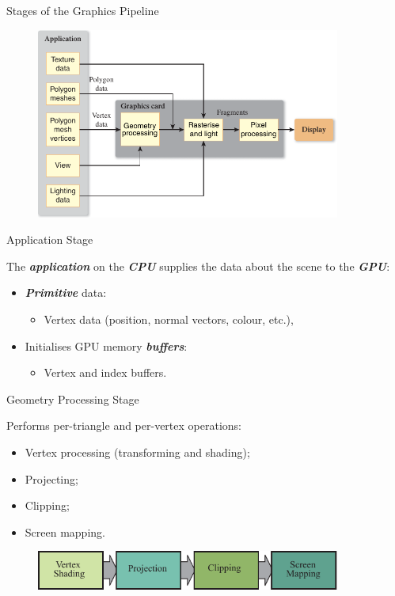 \documentclass{beamer}
\newcommand{\emphbf}[1]{\textbf{\emph{#1}}}
\begin{document}
\begin{frame}{Stages of the Graphics Pipeline}

	\begin{figure}[t]
		\includegraphics[width=10cm]{pipeline-2}
		\centering
	\end{figure}

\end{frame}

\begin{frame}{Application Stage}

	The \emphbf{application} on the \emphbf{CPU} supplies the data about the scene to the \emphbf{GPU}:

	\vskip 1cm

	\begin{itemize}
		\item \emphbf{Primitive} data:
		\begin{itemize}
			\item Vertex data (position, normal vectors, colour, etc.),
		\end{itemize}
		\item Initialises GPU memory \emphbf{buffers}:
		\begin{itemize}
			\item Vertex and index buffers.
		\end{itemize}
	\end{itemize}

\end{frame}

\begin{frame}{Geometry Processing Stage}

	Performs per-triangle and per-vertex operations:

	\begin{itemize}
		\item Vertex processing (transforming and shading);
		\item Projecting;
		\item Clipping;
		\item Screen mapping.
	\end{itemize}

	\vskip 1cm

	\begin{figure}[t]
		\includegraphics[width=10cm]{geometry-pipeline}
		\centering
	\end{figure}

\end{frame}
\end{document}
